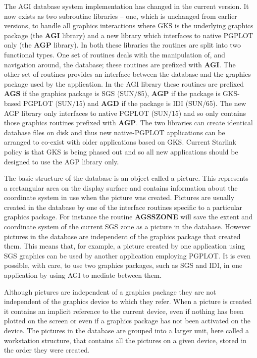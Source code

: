 \documentclass[twoside,11pt]{article}
\newcommand{\htmlref}[2]{#1}
\newcommand{\xref}[3]{#1}
\renewcommand{\_}{\texttt{\symbol{95}}}
\begin{document}
The AGI database system implementation has changed in the current
version. It now exists as two subroutine libraries -- one, which is
unchanged from earlier versions, to handle all graphics interactions
where GKS is the underlying graphics package (the {\bf AGI} library)
and a new library which interfaces to native PGPLOT only (the {\bf
AGP} library). In both these libraries the routines are split into two
functional types. One set of routines deals with the manipulation of,
and navigation around, the database; these routines are prefixed with
{\bf AGI\_}. The other set of routines provides an interface between
the database and the graphics package used by the application. In the
AGI library these routines are prefixed {\bf AGS\_} if the
graphics package is SGS (\xref{SUN/85}{sun85}{}), {\bf AGP\_} if the
package is GKS-based PGPLOT (\xref{SUN/15}{sun15}{}) and {\bf AGD\_}
if the package is IDI (\xref{SUN/65}{sun65}{}). The new AGP
library only interfaces to native PGPLOT (\xref{SUN/15}{sun15}{}) and
so only contains those  graphics routines prefixed with {\bf AGP\_}. The two
libraries can create identical database files on disk and thus new
native-PGPLOT applications can be arranged to co-exist with older
applications based on GKS. Current Starlink policy is that GKS is
being phased out and so all new applications should be designed to use
the AGP library only.

The basic structure of the database is an object called a picture. This
represents a rectangular area on the display surface and contains
information about the coordinate system in use when the picture was
created. Pictures are usually created in the database by one of the
interface routines specific to a particular graphics package. For
instance the routine 
\htmlref{{\bf AGS\_SZONE}}{AGS_SZONE} will save the extent and coordinate
system of the current SGS zone as a picture in the database. However
pictures in the database are independent of the graphics package that
created them. This means that, for example, a picture created by one
application using SGS graphics can be used by another application
employing PGPLOT. It is even possible, with care, to use two graphics
packages, such as SGS and IDI, in one application by using AGI to
mediate between them.

Although pictures are independent of a graphics package they are not
independent of the graphics device to which they refer. When a picture
is created it contains an implicit reference to the current device,
even if nothing has been plotted on the screen or even if a graphics
package has not been activated on the device.
The pictures in the database are grouped into a larger unit, here called
a workstation structure, that contains all the pictures on a given device,
stored in the order they were created.
\end{document}
